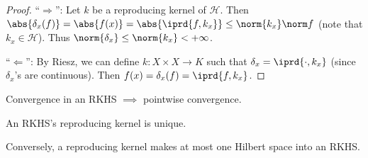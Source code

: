 	\begin{proof}
		``$\Rightarrow$'': Let $k$ be a reproducing kernel of $\mathscr H$. Then $\abs{\delta_x(f)} = \abs{f(x)} = \abs{\iprd{f, k_x}}\le \norm{k_x}\norm f$ (note that $k_x\in \mathscr H$). Thus $\norm{\delta_x}\le \norm{k_x} < +\infty$.
		
		``$\Leftarrow$'': By Riesz, we can define $k\colon X\times X\to K$ such that $\delta_x = \iprd{\cdot, k_x}$ (since $\delta_x$'s are continuous). Then $f(x) = \delta_x(f) = \iprd{f, k_x}$.
	\end{proof}
	
	
	
	\begin{cor}\label{COR: conv in RKHS implies pointwise convergence}
		Convergence in an RKHS $\implies$ pointwise convergence.
	\end{cor}
	
	
	\begin{thm}\label{THM: RKHS --> rk is injective}
		\leavevmode
		\begin{mylist}
			\item An RKHS's reproducing kernel is unique.
			
			\item Conversely, a reproducing kernel makes at most one Hilbert space into an RKHS.
		\end{mylist}
	\end{thm}
	
